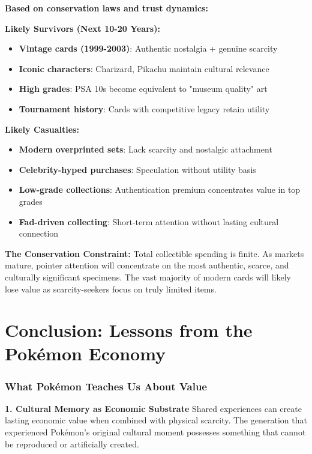\documentclass[11pt,oneside]{book}
\begin{document}
{{{{{{\textbf{Based on conservation laws and trust dynamics:}

\textbf{Likely Survivors (Next 10-20 Years):}
\begin{itemize}
\item \textbf{Vintage cards (1999-2003)}: Authentic nostalgia + genuine scarcity
\item \textbf{Iconic characters}: Charizard, Pikachu maintain cultural relevance
\item \textbf{High grades}: PSA 10s become equivalent to "museum quality" art
\item \textbf{Tournament history}: Cards with competitive legacy retain utility
\end{itemize}

\textbf{Likely Casualties:}
\begin{itemize}
\item \textbf{Modern overprinted sets}: Lack scarcity and nostalgic attachment
\item \textbf{Celebrity-hyped purchases}: Speculation without utility basis
\item \textbf{Low-grade collections}: Authentication premium concentrates value in top grades
\item \textbf{Fad-driven collecting}: Short-term attention without lasting cultural connection
\end{itemize}

\textbf{The Conservation Constraint:}
Total collectible spending is finite. As markets mature, pointer attention will concentrate on the most authentic, scarce, and culturally significant specimens. The vast majority of modern cards will likely lose value as scarcity-seekers focus on truly limited items.

\section{Conclusion: Lessons from the Pokémon Economy}

\subsubsection{What Pokémon Teaches Us About Value}

\textbf{1. Cultural Memory as Economic Substrate}
Shared experiences can create lasting economic value when combined with physical scarcity. The generation that experienced Pokémon's original cultural moment possesses something that cannot be reproduced or artificially created.

}}}}}}
\end{document}
